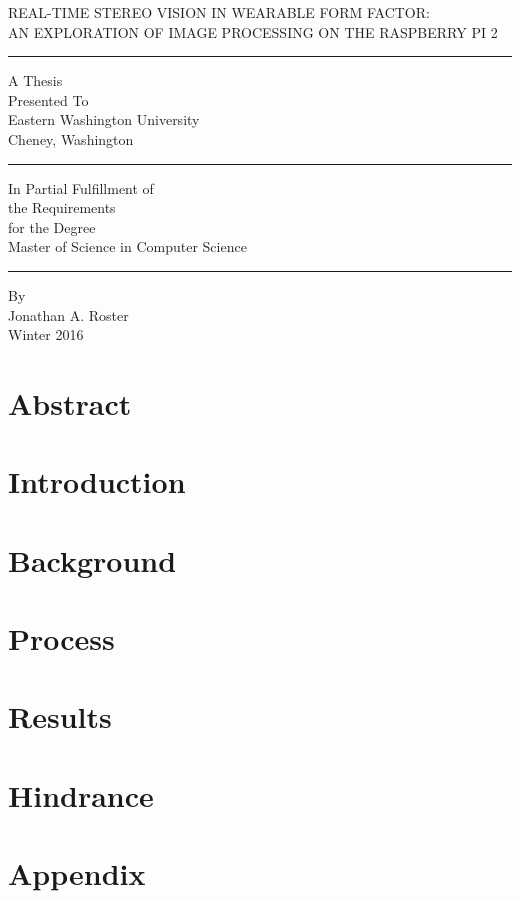 \documentclass[12]{report}
\begin{document}
\doublespace
\begin{center}
	REAL-TIME STEREO VISION IN WEARABLE FORM FACTOR:\\ AN EXPLORATION OF IMAGE PROCESSING ON THE RASPBERRY PI 2
\end{center}
\hrule
\begin{center}
	A Thesis\\
	Presented To\\
	Eastern Washington University\\
	Cheney, Washington\\
\end{center}
\hrule
\begin{center}
	In Partial Fulfillment of \\
	the Requirements\\
	for the Degree \\
	Master of Science in Computer Science\\
\end{center}
	\hrule
\begin{center}
	By \\
	Jonathan A. Roster\\
	Winter 2016
\end{center}


\tableofcontents
\chapter{Abstract}


\chapter{Introduction}


\chapter{Background}


\chapter{Process}



\chapter{Results}


\chapter{Hindrance}


\appendix
\chapter{Appendix}

\end{document}
